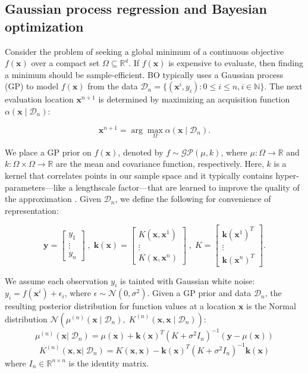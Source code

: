 \documentclass{article}
\begin{document}
\subsection{Gaussian process regression and Bayesian optimization}
Consider the problem of seeking a global minimum of a continuous objective $f(\textbf{x})$ over a 
compact set $\Omega \subseteq \mathbb{R^d}$. If $f(\textbf{x})$ is expensive to evaluate, then 
finding a minimum should be sample-efficient. BO typically uses a Gaussian process (GP) to model 
$f(\textbf{x})$ from the data $\mathcal{D}_n = \{(\textbf{x}^i, y_i) : 0 \leq i \leq n, i \in 
\mathbb{N}\}$. The next evaluation location $\textbf{x}^{n+1}$ is determined by maximizing an 
acquisition function $\alpha(\textbf{x} \;|\; \mathcal{D}_n)$:

$$
\textbf{x}^{n+1} = \arg\max_{\Omega} \alpha(\textbf{x} \;|\; \mathcal{D}_n).
$$

We place a GP prior on $f(\textbf{x})$, denoted by $f \sim \mathcal{GP}(\mu, k)$, where 
$\mu : \Omega \to \mathbb{R}$ and $k : \Omega \times \Omega \to \mathbb{R}$ are the mean and 
covariance function, respectively. Here,  $k$ is a kernel that correlates points in our sample space and it 
typically contains hyper-parameters—like a lengthscale factor—that are learned to improve the quality
of the approximation \cite{rasmussen_i._2006}. Given $\mathcal{D}_n$, we define the 
following for convenience of representation:

$$
\textbf{y} = \begin{bmatrix} y_1\\ \vdots \\ y_n\end{bmatrix} \;, \;\textbf{k}(\textbf{x}) = 
\begin{bmatrix}K(\textbf{x}, \textbf{x}^1) \\ \vdots \\ K(\textbf{x}, \textbf{x}^n) \end{bmatrix} 
\;,\; K = \begin{bmatrix}\textbf{k}(\textbf{x}^1)^T \\ \vdots \\ 
\textbf{k}(\textbf{x}^n)^T\end{bmatrix}.
$$

We assume each observation $y_i$ is tainted with Gaussian white noise: $y_i = f(\textbf{x}^i) + 
\epsilon_i$, where $\epsilon \sim \mathcal{N}(0, \sigma^2)$. Given a GP prior and data 
$\mathcal{D}_n$, the resulting posterior distribution for function values at a location $\textbf{x}$ 
is the Normal distribution $\mathcal{N}(\mu^{(n)}(\textbf{x}\;|\;\mathcal{D}_n),\; 
K^{(n)}(\textbf{x},\textbf{x} \; | \;\mathcal{D}_n))$:
\begin{equation}
    \mu^{(n)}(\textbf{x}|\;\mathcal{D}_n) = \mu(\textbf{x}) + 
    \textbf{k}(\textbf{x})^T(K+\sigma^2I_n)^{-1}(\textbf{y} - \mu(\textbf{x}))
\end{equation} 
\begin{equation}
    K^{(n)}(\textbf{x},\textbf{x}  | \;\mathcal{D}_n) = K(\textbf{x}, \textbf{x}) - 
    \textbf{k}(\textbf{x})^T(K+\sigma^2I_n)^{-1}\textbf{k}(\textbf{x})
\end{equation}
where $I_n \in \mathbb{R}^{n\times n}$ is the identity matrix.
\end{document}
